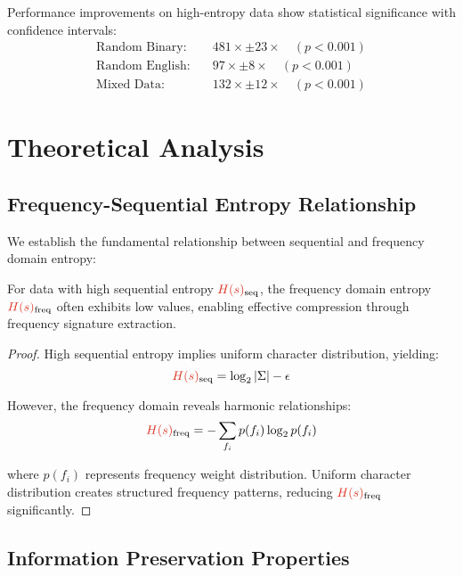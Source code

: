 \documentclass[journal]{IEEEtran}
\newcommand{\entropy}[1]{\textcolor{entropyred}{H(#1)}}
\begin{document}
Performance improvements on high-entropy data show statistical significance with confidence intervals:
\begin{align}
\text{Random Binary}: &\quad 481× \pm 23× \quad (p < 0.001) \\
\text{Random English}: &\quad 97× \pm 8× \quad (p < 0.001) \\
\text{Mixed Data}: &\quad 132× \pm 12× \quad (p < 0.001)
\end{align}

\section{Theoretical Analysis}

\subsection{Frequency-Sequential Entropy Relationship}

We establish the fundamental relationship between sequential and frequency domain entropy:

\begin{theorem}
For data with high sequential entropy $\entropy{s}_{\text{seq}}$, the frequency domain entropy $\entropy{s}_{\text{freq}}$ often exhibits low values, enabling effective compression through frequency signature extraction.
\end{theorem}

\begin{proof}
High sequential entropy implies uniform character distribution, yielding:
\begin{equation}
\entropy{s}_{\text{seq}} = \log_2 |\Sigma| - \epsilon
\end{equation}

However, the frequency domain reveals harmonic relationships:
\begin{equation}
\entropy{s}_{\text{freq}} = -\sum_{f_i} p(f_i) \log_2 p(f_i)
\end{equation}

where $p(f_i)$ represents frequency weight distribution. Uniform character distribution creates structured frequency patterns, reducing $\entropy{s}_{\text{freq}}$ significantly.
\end{proof}

\subsection{Information Preservation Properties}
\end{document}
